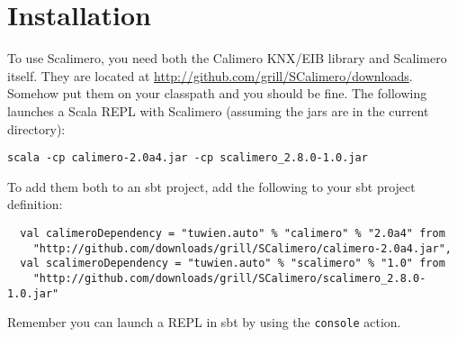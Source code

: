\chapter{Installation}

To use Scalimero, you need both the Calimero KNX/EIB library and Scalimero itself. They are located at \url{http://github.com/grill/SCalimero/downloads}. Somehow put them on your classpath and you should be fine. The following launches a Scala REPL with Scalimero (assuming the jars are in the current directory):
\begin{lstlisting}
scala -cp calimero-2.0a4.jar -cp scalimero_2.8.0-1.0.jar
\end{lstlisting}

To add them both to an sbt project, add the following to your sbt project definition:
\begin{lstlisting}
  val calimeroDependency = "tuwien.auto" % "calimero" % "2.0a4" from
    "http://github.com/downloads/grill/SCalimero/calimero-2.0a4.jar",
  val scalimeroDependency = "tuwien.auto" % "scalimero" % "1.0" from
    "http://github.com/downloads/grill/SCalimero/scalimero_2.8.0-1.0.jar"
\end{lstlisting}

Remember you can launch a REPL in sbt by using the \lstinline!console! action.
